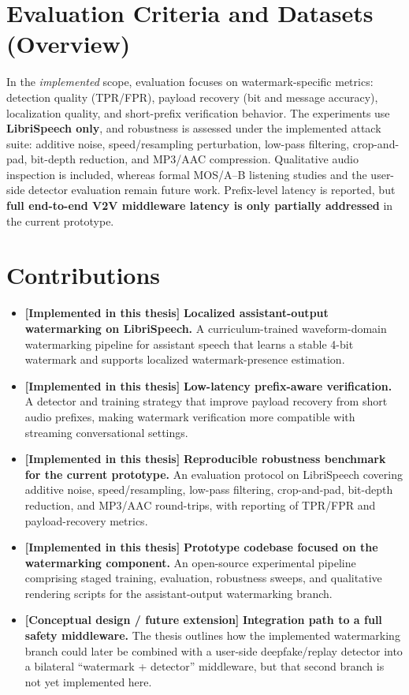 \section{Evaluation Criteria and Datasets (Overview)}
In the \emph{implemented} scope, evaluation focuses on watermark-specific metrics: detection quality (TPR/FPR), payload recovery (bit and message accuracy), localization quality, and short-prefix verification behavior. The experiments use \textbf{LibriSpeech only}, and robustness is assessed under the implemented attack suite: additive noise, speed/resampling perturbation, low-pass filtering, crop-and-pad, bit-depth reduction, and MP3/AAC compression. Qualitative audio inspection is included, whereas formal MOS/A--B listening studies and the user-side detector evaluation remain future work. Prefix-level latency is reported, but \textbf{full end-to-end V2V middleware latency is only partially addressed} in the current prototype.

\section{Contributions}
\begin{itemize}[leftmargin=1.25em]
  \item \textbf{[Implemented in this thesis]} \textbf{Localized assistant-output watermarking on LibriSpeech.} A curriculum-trained waveform-domain watermarking pipeline for assistant speech that learns a stable 4-bit watermark and supports localized watermark-presence estimation.
  \item \textbf{[Implemented in this thesis]} \textbf{Low-latency prefix-aware verification.} A detector and training strategy that improve payload recovery from short audio prefixes, making watermark verification more compatible with streaming conversational settings.
  \item \textbf{[Implemented in this thesis]} \textbf{Reproducible robustness benchmark for the current prototype.} An evaluation protocol on LibriSpeech covering additive noise, speed/resampling, low-pass filtering, crop-and-pad, bit-depth reduction, and MP3/AAC round-trips, with reporting of TPR/FPR and payload-recovery metrics.
  \item \textbf{[Implemented in this thesis]} \textbf{Prototype codebase focused on the watermarking component.} An open-source experimental pipeline comprising staged training, evaluation, robustness sweeps, and qualitative rendering scripts for the assistant-output watermarking branch.
  \item \textbf{[Conceptual design / future extension]} \textbf{Integration path to a full safety middleware.} The thesis outlines how the implemented watermarking branch could later be combined with a user-side deepfake/replay detector into a bilateral ``watermark + detector'' middleware, but that second branch is not yet implemented here.
\end{itemize}
